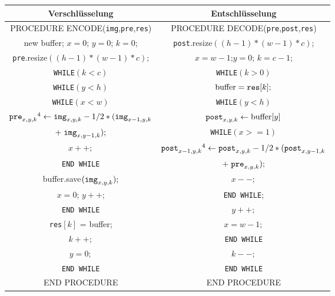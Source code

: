 \documentclass[a4paper,12pt]{article}
\begin{document}
\begin{tabular}{c|c}
Verschlüsselung & Entschlüsselung
\\
\hline
PROCEDURE ENCODE({\tt{img}},{\tt{pre}},{\tt{res}}) & PROCEDURE DECODE({\tt{pre}},{\tt{post}},{\tt{res}})
\\
new buffer; $x=0$; $y=0$; $k=0$; & {\tt{post}}.resize$((h-1)*(w-1)*c)$;
\\
{\tt{pre}}.resize$((h-1)*(w-1)*c)$; & $x=w-1$;$y=0$; $k=c-1$;
\\
{\tt{WHILE}}$(k < c)$ &                  {\tt{WHILE}}$(k > 0)$
\\
{\tt{WHILE}}$(y < h)$ &               $\text{buffer} = \text{{\tt{res}}}[k];$
\\
{\tt{WHILE}}$(x < w)$ &              {\tt{WHILE}}$(y<h)$
\\
$\text{{\tt{pre}}}_{x,y,k}\footnotemark[4]\leftarrow \text{{\tt{img}}}_{x,y,k} - 1/2 *(\text{{\tt{img}}}_{x-1,y,k}$ &  $\text{{\tt{post}}}_{x,y,k}\leftarrow \text{buffer}[y]$
\\
$+\;\text{{\tt{img}}}_{x,y-1,k});$  & {\tt{WHILE}}$(x>=1)$
\\
$x++;$ &  $\text{{\tt{post}}}_{x-1,y,k}\footnotemark[4]\leftarrow \text{{\tt{post}}}_{x,y,k} - 1/2* (\text{{\tt{post}}}_{x,y-1,k}$  
\\
{\tt{END {\tt{WHILE}}}}  & $+\;\text{{\tt{pre}}}_{x,y,k});$
\\
buffer.save$(\text{{\tt{img}}}_{x,y,k});$  & $x--;$
\\
$x=0$; $y++$;  &   {\tt{END {\tt{WHILE}}}}; 
\\
{\tt{END {\tt{WHILE}}}}   & $y++;$ 
\\
{\tt{res}}$[k]$ = buffer;  & $x=w-1;$ 
\\
$k++;$   &  {\tt{END {\tt{WHILE}}}}   
\\
$y=0;$ &   $k--;$
\\
{\tt{END {\tt{WHILE}}}} & {\tt{END {\tt{WHILE}}}} 
\\
END PROCEDURE & END PROCEDURE
\end{tabular}
\end{document}
